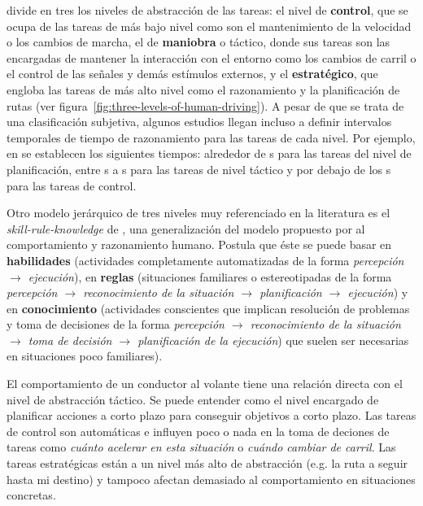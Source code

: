 \cite{michon1985critical} divide en tres los niveles de abstracción de las tareas: el nivel de \textbf{control}, que se ocupa de las tareas de más bajo nivel como son el mantenimiento de la velocidad o los cambios de marcha, el de \textbf{maniobra} o táctico, donde sus tareas son las encargadas de mantener la interacción con el entorno como los cambios de carril o el control de las señales y demás estímulos externos, y el \textbf{estratégico}, que engloba las tareas de más alto nivel como el razonamiento y la planificación de rutas (ver figura~\ref{fig:three-levels-of-human-driving}). A pesar de que se trata de una clasificación subjetiva, algunos estudios llegan incluso a definir intervalos temporales de tiempo de razonamiento para las tareas de cada nivel. Por ejemplo, en \cite{Alexiadis2004} se establecen los siguientes tiempos: alrededor de \unit[30]{s} para las tareas del nivel de planificación, entre \unit[5]{s} a \unit[30]{s} para las tareas de nivel táctico y por debajo de los \unit[5]{s} para las tareas de control.

Otro modelo jerárquico de tres niveles muy referenciado en la literatura es el \textit{skill-rule-knowledge} de \cite{Rasmussen1986}, una generalización del modelo propuesto por \cite{michon1985critical} al comportamiento y razonamiento humano. Postula que éste se puede basar en \textbf{habilidades} (actividades completamente automatizadas de la forma \textit{percepción $\rightarrow$ ejecución}), en \textbf{reglas} (situaciones familiares o estereotipadas de la forma \textit{percepción $\rightarrow$ reconocimiento de la situación $\rightarrow$ planificación $\rightarrow$ ejecución}) y en \textbf{conocimiento} (actividades conscientes que implican resolución de problemas y toma de decisiones de la forma \textit{percepción $\rightarrow$ reconocimiento de la situación $\rightarrow$ toma de decisión $\rightarrow$ planificación de la ejecución}) que suelen ser necesarias en situaciones poco familiares).

El comportamiento de un conductor al volante tiene una relación directa con el nivel de abstracción táctico. Se puede entender como el nivel encargado de planificar acciones a corto plazo para conseguir objetivos a corto plazo. Las tareas de control son automáticas e influyen poco o nada en la toma de deciones de tareas como \textit{cuánto acelerar en esta situación} o \textit{cuándo cambiar de carril}. Las tareas estratégicas están a un nivel más alto de abstracción (e.g. la ruta a seguir hasta mi destino) y tampoco afectan demasiado al comportamiento en situaciones concretas.

